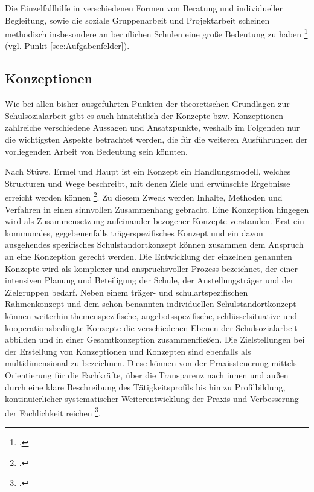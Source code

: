 Die Einzelfallhilfe in verschiedenen Formen von Beratung und individueller Begleitung, sowie die soziale Gruppenarbeit und Projektarbeit scheinen methodisch insbesondere an beruflichen Schulen eine große Bedeutung zu haben \footcite[vgl.][10ff]{LSS2004} (vgl. Punkt \ref{sec:Aufgabenfelder}).

\subsection{Konzeptionen}
\label{sec:Konzeptionen}

Wie bei allen bisher ausgeführten Punkten der theoretischen Grundlagen zur Schulsozialarbeit gibt es auch hinsichtlich der Konzepte bzw. Konzeptionen zahlreiche verschiedene Aussagen und Ansatzpunkte, weshalb im Folgenden nur die wichtigsten Aspekte betrachtet werden, die für die weiteren Ausführungen der vorliegenden Arbeit von Bedeutung sein könnten. 

Nach Stüwe, Ermel und Haupt ist ein Konzept ein Handlungsmodell, welches Strukturen und Wege beschreibt, mit denen Ziele und erwünschte Ergebnisse erreicht werden können \footcite[vgl.][148]{Stuewe2015}. Zu diesem Zweck werden Inhalte, Methoden und Verfahren in einen sinnvollen Zusammenhang gebracht. Eine Konzeption hingegen wird als Zusammensetzung aufeinander bezogener Konzepte verstanden. Erst ein kommunales, gegebenenfalls trägerspezifisches Konzept und ein davon ausgehendes spezifisches Schulstandortkonzept können zusammen dem Anspruch an eine Konzeption gerecht werden. Die Entwicklung der einzelnen genannten Konzepte wird als komplexer und anspruchsvoller Prozess bezeichnet, der einer intensiven Planung und Beteiligung der Schule, der Anstellungsträger und der Zielgruppen bedarf. Neben einem träger- und schulartspezifischen Rahmenkonzept und dem schon benannten individuellen Schulstandortkonzept können weiterhin themenspezifische, angebotsspezifische, schlüsselsituative und kooperationsbedingte Konzepte die verschiedenen Ebenen der Schulsozialarbeit abbilden und in einer Gesamtkonzeption zusammenfließen. Die Zielstellungen bei der Erstellung von Konzeptionen und Konzepten sind ebenfalls als multidimensional zu bezeichnen. Diese können von der Praxissteuerung mittels Orientierung für die Fachkräfte, über die Transparenz nach innen und außen durch eine klare Beschreibung des Tätigkeitsprofils bis hin zu Profilbildung, kontinuierlicher systematischer Weiterentwicklung der Praxis und Verbesserung der Fachlichkeit reichen \footcite[vgl.][148ff]{Stuewe2015}.


